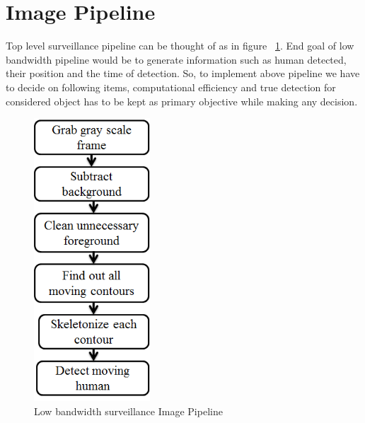 \section{Image Pipeline}


\indent Top level surveillance pipeline can be thought of as in figure
~\ref{image_pipeline}.  End goal of low bandwidth pipeline would be to
generate information such as human detected, their position and the time
of detection. So, to implement above pipeline we have to decide on
following items, computational efficiency and true detection for
considered object has to be kept as primary objective while making any
decision.

\begin{figure}[!t]
\centering
\includegraphics[height=300pt]{Figures/image_pipeline}
\caption{Low bandwidth surveillance Image Pipeline}
\label{image_pipeline}
\end{figure}

